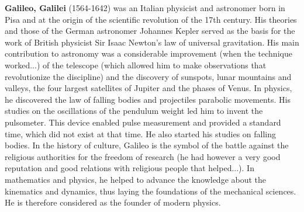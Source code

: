 \textbf{Galileo, Galilei} (1564-1642) was an Italian physicist and astronomer born in Pisa and at the origin of the scientific revolution of the 17th century. His theories and those of the German astronomer Johannes Kepler served as the basis for the work of British physicist Sir Isaac Newton's law of universal gravitation. His main contribution to astronomy was a considerable improvement (when the technique worked...) of the telescope (which allowed him to make observations that revolutionize the discipline) and the discovery of sunspots, lunar mountains and valleys, the four largest satellites of Jupiter and the phases of Venus. In physics, he discovered the law of falling bodies and projectiles parabolic movements. His studies on the oscillations of the pendulum weight led him to invent the pulsometer. This device enabled pulse measurement and provided a standard time, which did not exist at that time. He also started his studies on falling bodies. In the history of culture, Galileo is the symbol of the battle against the religious authorities for the freedom of research (he had however a very good reputation and good relations with religious people that helped...). In mathematics and physics, he helped to advance the knowledge about the kinematics and dynamics, thus laying the foundations of the mechanical sciences. He is therefore considered as the founder of modern physics.


